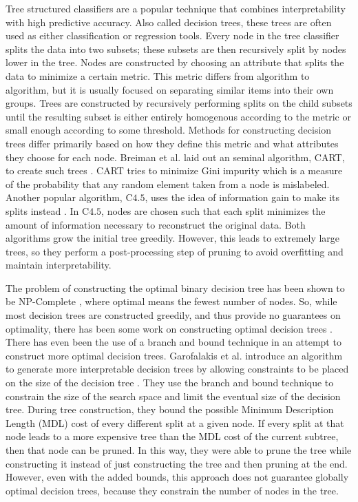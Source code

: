 Tree structured classifiers are a popular technique that combines interpretability with high predictive accuracy.
Also called decision trees, these trees are often used as either classification or regression tools.
Every node in the tree classifier splits the data into two subsets; these subsets are then recursively split by nodes lower in the tree.
Nodes are constructed by choosing an attribute that splits the data to minimize a certain metric.
This metric differs from algorithm to algorithm, but it is usually focused on separating similar items into their own groups.%
Trees are constructed by recursively performing splits on the child subsets until the resulting subset is either entirely homogenous according to the metric or small enough according to some threshold.
Methods for constructing decision trees differ primarily based on how they define this metric and what attributes they choose for each node.
Breiman et al. laid out an seminal algorithm, CART, to create such trees \cite{BreimanFrOlSt84}.
CART tries to minimize Gini impurity which is a measure of the probability that any random element taken from a node is mislabeled.
Another popular algorithm, C$4.5$, uses the idea of information gain to make its splits instead \cite{Quinlan93}.
In C$4.5$, nodes are chosen such that each split minimizes the amount of information necessary to reconstruct the original data.
Both algorithms grow the initial tree greedily.
However, this leads to extremely large trees, so they perform a post-processing step of pruning to avoid overfitting and maintain interpretability.

The problem of constructing the optimal binary decision tree has been shown to be NP-Complete \cite{HyafilRi76}, where optimal means the fewest number of nodes.
So, while most decision trees are constructed greedily, and thus provide no guarantees on optimality, there has been some work on constructing optimal decision trees \cite{Moret82}.
There has even been the use of a branch and bound technique in an attempt to construct more optimal decision trees.
Garofalakis et al. introduce an algorithm to generate more interpretable decision trees by allowing constraints to be placed on the size of the decision tree \cite{GarofalakisHyRaSh00}.
They use the branch and bound technique to constrain the size of the search space and limit the eventual size of the decision tree.
During tree construction, they bound the possible Minimum Description Length (MDL) cost of every different split at a given node.
If every split at that node leads to a more expensive tree than the MDL cost of the current subtree, then that node can be pruned.
In this way, they were able to prune the tree while constructing it instead of just constructing the tree and then pruning at the end.
However, even with the added bounds, this approach does not guarantee globally optimal decision trees, because they constrain the number of nodes in the tree.

